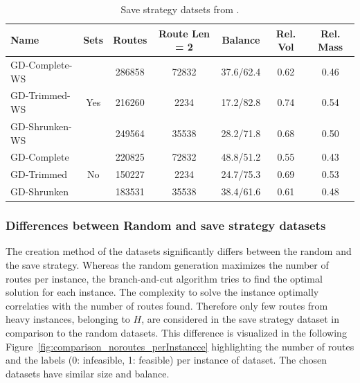 \begin{table}[!ht]
    \centering
    \small
    \begin{tabular}{l c c c c c c }
        \toprule
        Name           & Sets                 & Routes & Route Len = 2 & Balance   & Rel. Vol & Rel. Mass \\
        \midrule
        GD-Complete-WS & \multirow{3}{*}{Yes} & 286858 & 72832         & 37.6/62.4 & 0.62     & 0.46      \\
        GD-Trimmed-WS  &                      & 216260 & 2234          & 17.2/82.8 & 0.74     & 0.54      \\
        GD-Shrunken-WS &                      & 249564 & 35538         & 28.2/71.8 & 0.68     & 0.50      \\        \midrule
        GD-Complete    & \multirow{3}{*}{No}  & 220825 & 72832         & 48.8/51.2 & 0.55     & 0.43      \\
        GD-Trimmed     &                      & 150227 & 2234          & 24.7/75.3 & 0.69     & 0.53      \\
        GD-Shrunken    &                      & 183531 & 35538         & 38.4/61.6 & 0.61     & 0.48      \\
        \bottomrule
    \end{tabular}
    \caption[Save strategy train datsets from \gendreauDataSet.]{Save strategy datsets from \gendreauDataSet.}
    \label{tab:saved_instances_gendreau}
\end{table}

\subsubsection{Differences between Random and save strategy datasets}

The creation method of the datasets significantly differs between the random and the save strategy. Whereas the random
generation maximizes the number of routes per instance, the branch-and-cut algorithm tries to
find the optimal solution for each instance. The complexity to solve the instance optimally correlaties with the number of routes found.
Therefore only few routes from heavy instances, belonging to $H$, are considered in the save strategy dataset
in comparison to the random datasets. This difference is visualized in the following Figure~\ref{fig:comparison_noroutes_perInstancce}
highlighting the number of routes and the labels (0: infeasible, 1: feasible) per instance of \gendreauDataSet dataset. The chosen
datasets have similar size and balance.

